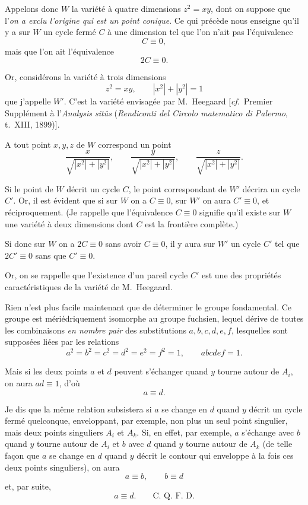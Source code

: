 \documentclass{article}
\begin{document}
Appelons donc $W$ la variété à quatre dimensions $z^{2} = xy$, dont on suppose que l'\emph{on a exclu l'origine qui est un point conique}. Ce qui précède nous enseigne qu'il y a sur $W$ un cycle fermé $C$ à une dimension tel que l'on n'ait pas l'équivalence
\[ C \equiv 0, \]
mais que l'on ait l'équivalence
\[ 2C \equiv 0. \]

Or, considérons la variété à trois dimensions
\[ z^{2} = xy, \qquad |x^{2}| + |y^{2}| = 1 \]
que j'appelle $W'$. C'est la variété envisagée par M.~Heegaard [\emph{cf}.\ Premier Supplément à l'\emph{Analysis sitûs} (\emph{Rendiconti del Circolo matematico di Palermo}, t.\ XIII, 1899)].


A tout point $x, y, z$ de $W$ correspond un point
\[ \frac{x}{\sqrt{|x^{2}| + |y^{2}|}}, \qquad \frac{y}{\sqrt{|x^{2}| + |y^{2}|}}, \qquad \frac{z}{\sqrt{|x^{2}| + |y^{2}|}}. \]

Si le point de $W$ décrit un cycle $C$, le point correspondant de $W'$ décrira un cycle $C'$. Or, il est évident que si sur $W$ on a $C \equiv 0$, sur $W'$ on aura $C' \equiv 0$, et réciproquement. (Je rappelle que l'équivalence $C \equiv 0$ signifie qu'il existe sur $W$ une variété à deux dimensions dont $C$ est la frontière complète.)

Si donc sur $W$ on a $2C \equiv 0$ sans avoir $C \equiv 0$, il y aura sur $W'$ un cycle $C'$ tel que $2C' \equiv 0$ sans que $C' \equiv 0$.

Or, on se rappelle que l'existence d'un pareil cycle $C'$ est une des propriétés caractéristiques de la variété de M.~Heegaard.

Rien n'est plus facile maintenant que de déterminer le groupe fondamental. Ce groupe est mériédriquement isomorphe au groupe fuchsien, lequel dérive de toutes les combinaisons \emph{en nombre pair} des substitutions $a, b, c, d, e, f$, lesquelles sont supposées liées par les relations
\[ a^{2} = b^{2} = c^{2} = d^{2} = e^{2} = f^{2} = 1, \qquad abcdef = 1. \]

Mais si les deux points $a$ et $d$ peuvent s'échanger quand $y$ tourne autour de $A_{i}$, on aura $ad \equiv 1$, d'où
\[ a \equiv d. \]

Je dis que la même relation subsistera si $a$ se change en $d$ quand $y$ décrit un cycle fermé quelconque, enveloppant, par exemple, non plus un seul point singulier, mais deux points singuliers $A_{i}$ et $A_{k}$. Si, en effet, par exemple, $a$ s'échange avec $b$ quand $y$ tourne autour de $A_{i}$ et $b$ avec $d$ quand $y$ tourne autour de $A_{k}$ (de telle façon que $a$ se change en $d$ quand $y$ décrit le contour qui enveloppe à la fois ces deux points singuliers), on aura
\[ a \equiv b, \qquad b \equiv d \]
et, par suite,
\[ a \equiv d. \qquad \text{C.~Q.~F.~D.} \]
\end{document}
